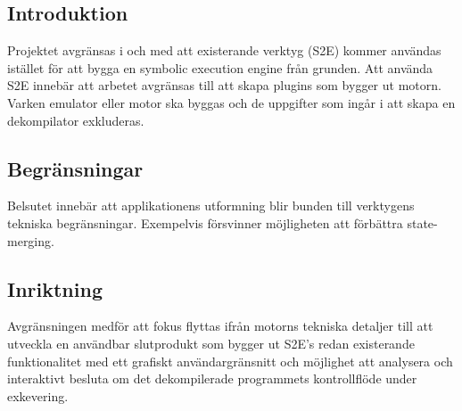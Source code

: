 
\subsection{Introduktion} 

Projektet avgränsas i och med att existerande verktyg (S2E) kommer användas 
istället för att bygga en symbolic execution engine från grunden. 
Att använda S2E innebär att arbetet avgränsas till att skapa plugins som 
bygger ut motorn. Varken emulator eller motor ska byggas och de uppgifter 
som ingår i att skapa en dekompilator exkluderas. 

\subsection{Begränsningar} 

Belsutet innebär att applikationens utformning blir bunden till 
verktygens tekniska begränsningar. Exempelvis försvinner möjligheten att 
förbättra state-merging. 

\subsection{Inriktning} 

Avgränsningen medför att fokus flyttas ifrån motorns tekniska detaljer 
till att utveckla en användbar slutprodukt som bygger ut S2E's redan 
existerande funktionalitet med ett grafiskt användargränsnitt 
och möjlighet att analysera och interaktivt besluta om det dekompilerade 
programmets kontrollflöde under exkevering.
 
